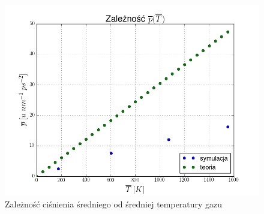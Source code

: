 \documentclass[10]{article}
\begin{document}
\begin{figure}[H]
\begin{center}
\includegraphics[scale=0.6]{p_av(T_av).png}
\caption{Zależność ciśnienia średniego od średniej temperatury gazu} \label{wykres:clappeyron}
\end{center}
\end{figure}
\end{document}
